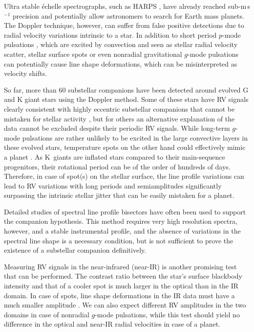 \documentclass{aa}
\begin{document}
Ultra stable  \'{e}chelle spectrographs, 
such as HARPS \citep{Mayor2003}, have already reached sub-m\,s$^{-1}$ precision 
and potentially allow astronomers to search for Earth mass planets.
The Doppler technique, however, can suffer from false positive detections due to 
radial velocity variations intrinsic to a star. 
In addition to short period $p$-mode pulsations \citep{Barban, Zechmeister2008}, which are excited by 
convection and seen as stellar radial velocity scatter, 
stellar surface spots or even nonradial gravitational $g$-mode pulsations can potentially 
cause line shape deformations, which can be misinterpreted as velocity shifts.
 

So far, more than 60 substellar companions have been detected around evolved G and K giant stars
using the Doppler method. 
Some of these stars have RV signals clearly consistent with highly eccentric substellar companions
that cannot be mistaken for stellar activity \citep[e.g.,][]{Frink2,Moutou2011,Sato2013},
but for others an alternative explanation of the data cannot be excluded despite their periodic RV signals.
While long-term $g$-mode pulsations are rather unlikely to be excited  
in the large convective layers in these evolved stars,  
temperature spots on the other hand could effectively mimic a planet \citep[e.g.,][]{Hatzes2000}. 
As K~giants are inflated stars compared to their main-sequence progenitors, 
their rotational period can be of the order of hundreds of days.
Therefore, in case of spot(s) on the stellar surface, the line profile variations can lead to 
RV variations with long periods and semiamplitudes significantly surpassing the intrinsic stellar jitter
that can be easily mistaken for a planet.

Detailed studies of spectral line profile bisectors have often been used to support the companion hypothesis.
This method requires very high resolution spectra, however, and a stable instrumental profile, and the absence of variations in the spectral line shape is  a necessary condition, 
but is not sufficient to  prove the existence of a substellar companion definitively. 


Measuring RV signals in the near-infrared (near-IR) is another promising test that can be performed. The contrast 
ratio between the star's surface blackbody intensity and that of a cooler spot 
is much larger in the optical than in the IR domain. In case of spots, 
 line shape deformations in the IR data must have a much smaller amplitude \citep{Desort2007, Reiners2010}. 
We can also expect different RV amplitudes in the two domains 
in case of nonradial $g$-mode pulsations, while this test should yield no difference 
in the optical and near-IR radial velocities in case of a planet.
\end{document}

